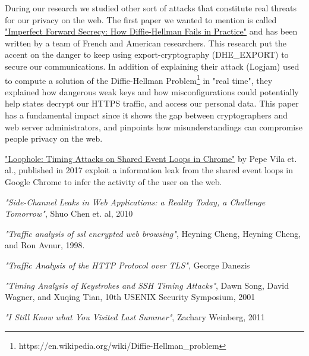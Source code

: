 \documentclass[journal]{IEEEtran}
\begin{document}
During our research we studied other sort of attacks that constitute real threats for our privacy on the web. The first paper we wanted to mention is called \ul{"Imperfect Forward Secrecy: How Diffie-Hellman Fails in Practice"} and has been written by a team of French and American researchers. This research put the accent on the danger to keep using export-cryptography (DHE\_EXPORT) to secure our communications. In addition of explaining their attack (Logjam) used to compute a solution of the Diffie-Hellman Problem\footnote{https://en.wikipedia.org/wiki/Diffie-Hellman\_problem} in "real time", they explained how dangerous weak keys and how misconfigurations could potentially help states decrypt our HTTPS traffic, and access our personal data. This paper has a fundamental impact since it shows the gap between cryptographers and web server administrators, and pinpoints how misunderstandings can compromise people privacy on the web.

\medskip

\ul{"Loophole: Timing Attacks on Shared Event Loops in Chrome"} by Pepe Vila et. al., published in 2017 exploit a information leak from the shared event loops in Google Chrome to infer the activity of the user on the web.


\begin{thebibliography}{1}

\textit{"Side-Channel Leaks in Web Applications: a Reality Today, a Challenge Tomorrow"}, 
Shuo Chen et. al, 
2010

\textit{"Traffic analysis of ssl encrypted web browsing"}, 
Heyning Cheng, Heyning Cheng, and Ron Avnur,
1998. 

\textit{"Traffic Analysis of the HTTP Protocol over TLS"},
George Danezis


\textit{"Timing Analysis of Keystrokes and SSH Timing Attacks"},
Dawn Song, David Wagner, and Xuqing Tian,
10th USENIX Security Symposium, 
2001 

\textit{"I Still Know what You Visited Last Summer"},
Zachary Weinberg, 
2011


\end{thebibliography}

\ifCLASSOPTIONcaptionsoff
  \newpage
\fi
\end{document}
